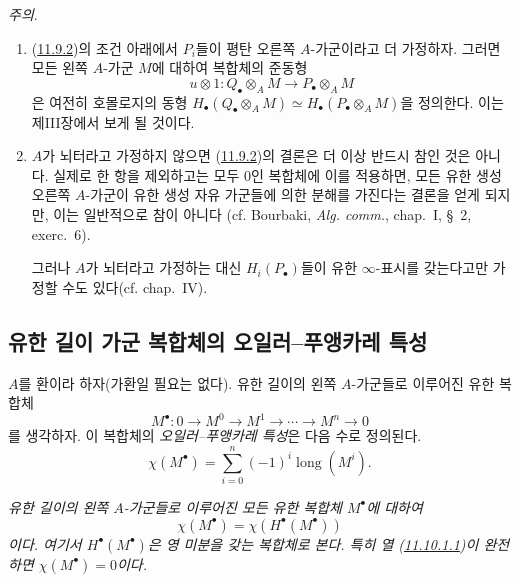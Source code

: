 \begin{env}[11.9.3]
\label{0.11.9.3-fr}
\emph{주의}.
\begin{enumerate}
\item[{\rm(i)}] (\hyperref[0.11.9.2-fr]{11.9.2})의 조건 아래에서
$P_i$들이 평탄 오른쪽 $A$-가군이라고 더 가정하자. 그러면 모든 왼쪽
$A$-가군 $M$에 대하여 복합체의 준동형
\[
u\otimes 1:Q_\bullet\otimes_A M\longrightarrow P_\bullet\otimes_A M
\]
은 여전히 호몰로지의 동형
$H_\bullet(Q_\bullet\otimes_A M)\simeq
H_\bullet(P_\bullet\otimes_A M)$을 정의한다. 이는 제III장에서 보게 될
것이다.
\item[{\rm(ii)}] $A$가 뇌터라고 가정하지 않으면
(\hyperref[0.11.9.2-fr]{11.9.2})의 결론은 더 이상 반드시 참인 것은
아니다. 실제로 한 항을 제외하고는 모두 $0$인 복합체에 이를 적용하면,
모든 유한 생성 오른쪽 $A$-가군이 유한 생성 자유 가군들에 의한 분해를
가진다는 결론을 얻게 되지만, 이는 일반적으로 참이 아니다
(cf. Bourbaki, \emph{Alg. comm.}, chap.~I, \S~2, exerc.~6).

그러나 $A$가 뇌터라고 가정하는 대신 $H_i(P_\bullet)$들이 유한
$\infty$-표시를 갖는다고만 가정할 수도 있다(cf. chap.~IV).
\end{enumerate}
\end{env}

\subsection{유한 길이 가군 복합체의 오일러--푸앵카레 특성}
\label{subsection:0.11.10-fr}

\begin{env}[11.10.1]
\label{0.11.10.1-fr}
$A$를 환이라 하자(가환일 필요는 없다). 유한 길이의 왼쪽
$A$-가군들로 이루어진 유한 복합체
\[
\label{0.11.10.1.1-fr}
\tag{11.10.1.1}
M^\bullet:0\longrightarrow M^0\longrightarrow M^1
\longrightarrow\cdots\longrightarrow M^n\longrightarrow0
\]
를 생각하자. 이 복합체의 \emph{오일러--푸앵카레 특성}은 다음 수로
정의된다.
\[
\label{0.11.10.1.2-fr}
\tag{11.10.1.2}
\chi(M^\bullet)=\sum_{i=0}^{n}(-1)^i\operatorname{long}(M^i).
\]
\end{env}

\begin{proposition}[11.10.2]
\label{0.11.10.2-fr}
\emph{유한 길이의 왼쪽 $A$-가군들로 이루어진 모든 유한 복합체
$M^\bullet$에 대하여
\[
\chi(M^\bullet)=\chi(H^\bullet(M^\bullet))
\]
이다. 여기서 $H^\bullet(M^\bullet)$은 영 미분을 갖는 복합체로 본다.
특히 열 (\hyperref[0.11.10.1.1-fr]{11.10.1.1})이 완전하면
$\chi(M^\bullet)=0$이다.}
\end{proposition}

